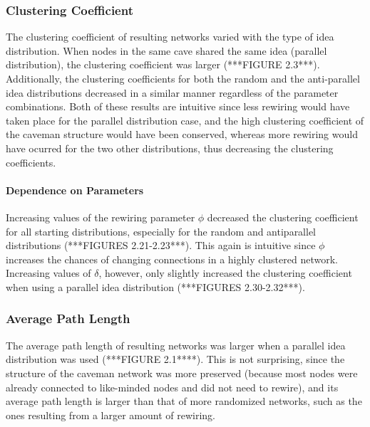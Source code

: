 \subsubsection{Clustering Coefficient}

The clustering coefficient of resulting networks varied with the type of idea distribution. When nodes in the same cave shared the same idea (parallel distribution), the clustering coefficient was larger (***FIGURE 2.3***). Additionally, the clustering coefficients for both the random and the anti-parallel idea distributions decreased in a similar manner regardless of the parameter combinations. Both of these results are intuitive since less rewiring would have taken place for the parallel distribution case, and the high clustering coefficient of the caveman structure would have been conserved, whereas more rewiring would have ocurred for the two other distributions, thus decreasing the clustering coefficients.

\paragraph{Dependence on Parameters}
Increasing values of the rewiring parameter $\phi$ decreased the clustering coefficient for all starting distributions, especially for the random and antiparallel distributions (***FIGURES 2.21-2.23***). This again is intuitive since $\phi$ increases the chances of changing connections in a highly clustered network.
Increasing values of $\delta$, however, only slightly increased the clustering coefficient when using a parallel idea distribution (***FIGURES 2.30-2.32***). 

\subsubsection{Average Path Length}
The average path length of resulting networks was larger when a parallel idea distribution was used (***FIGURE 2.1****). This is not surprising, since the structure of the caveman network was more preserved (because most nodes were already connected to like-minded nodes and did not need to rewire), and its average path length is larger than that of more randomized networks, such as the ones resulting from a larger amount of rewiring. 
